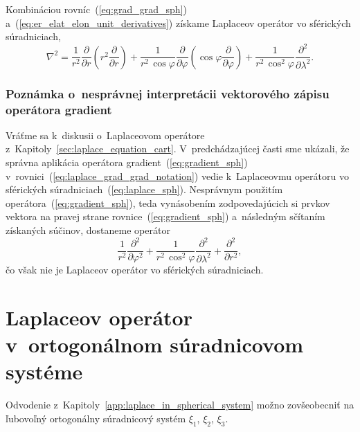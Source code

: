 \documentclass[a4paper, 12pt]{book}
\begin{document}
%
Kombináciou rovníc~(\ref{eq:grad_grad_sph}) 
a~(\ref{eq:er_elat_elon_unit_derivatives}) získame Laplaceov operátor vo 
sférických súradniciach,
%
\begin{equation}
\label{eq:laplace_sph}
\nabla^2 = \frac{1}{r^2} \frac{\partial}{\partial r} \left( r^2
\frac{\partial}{\partial r} \right) + \frac{1}{r^2 \, \cos\varphi}
\frac{\partial}{\partial \varphi} \left( \cos\varphi \frac{\partial}{\partial 
\varphi} \right) + \frac{1}{r^2 \,
\cos^2\varphi}\frac{\partial^2}{\partial \lambda^2}{.}
\end{equation}

\subsubsection{Poznámka o~nesprávnej interpretácii vektorového zápisu operátora 
gradient}

Vráťme sa k~diskusii o~Laplaceovom operátore 
z~Kapitoly~\ref{sec:laplace_equation_cart}.  V~predchádzajúcej časti sme 
ukázali, že správna aplikácia operátora gradient~(\ref{eq:gradient_sph}) 
v~rovnici~(\ref{eq:laplace_grad_grad_notation}) vedie k~Laplaceovmu operátoru 
vo sférických súradniciach~(\ref{eq:laplace_sph}).  Nesprávnym použitím 
operátora~(\ref{eq:gradient_sph}), teda vynásobením zodpovedajúcich si prvkov 
vektora na pravej strane rovnice~(\ref{eq:gradient_sph}) a~následným sčítaním 
získaných súčinov, dostaneme operátor
%
\begin{equation}
\frac{1}{r^2} \frac{\partial^2}{\partial \varphi^2} + \frac{1}{r^2 \, 
\cos^2\varphi} \frac{\partial^2}{\partial \lambda^2} 
+ \frac{\partial^2}{\partial r^2}{,}
\end{equation}
%
čo však nie je Laplaceov operátor vo sférických súradniciach.




\section{Laplaceov operátor v~ortogonálnom súradnicovom systéme}
\label{app:laplace_in_orthogonal_coordinates}

Odvodenie z~Kapitoly~\ref{app:laplace_in_spherical_system} možno zovšeobecniť 
na ľubovoľný ortogonálny súradnicový systém $\xi_1$, $\xi_2$, $\xi_3$.
\end{document}
